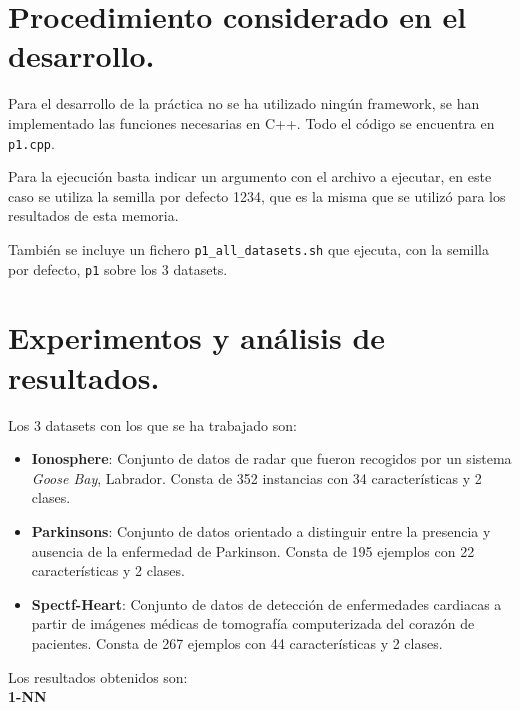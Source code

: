 \documentclass[11pt,a4paper]{article}
\theoremstyle{definition}
\begin{document}
	

	\section{Procedimiento considerado en el desarrollo.}
	Para el desarrollo de la práctica no se ha utilizado ningún framework, se han implementado las funciones necesarias en C++. Todo el código se encuentra en \texttt{p1.cpp}.
	
	Para la ejecución basta indicar un argumento con el archivo a ejecutar, en este caso se utiliza la semilla por defecto 1234, que es la misma que se utilizó para los resultados de esta memoria.
	
	También se incluye un fichero \texttt{p1\_all\_datasets.sh} que ejecuta, con la semilla por defecto, \texttt{p1} sobre los 3 datasets.
	\section{Experimentos y análisis de resultados.}
	Los 3 datasets con los que se ha trabajado son:
	\begin{itemize}
		\item \textbf{Ionosphere}: Conjunto de datos de radar que fueron recogidos por un sistema \textit{Goose Bay}, Labrador. Consta de 352 instancias con 34 características y 2 clases.
		\item \textbf{Parkinsons}: Conjunto de datos orientado a distinguir entre la presencia y ausencia de la enfermedad de Parkinson. Consta de 195 ejemplos con 22 características y 2 clases.
		\item \textbf{Spectf-Heart}: Conjunto de datos de detección de enfermedades cardiacas a partir de imágenes médicas de tomografía computerizada del corazón de pacientes. Consta de 267 ejemplos con 44 características y 2 clases.
	\end{itemize}
	
	Los resultados obtenidos son:~\\
	
	\textbf{1-NN}
\end{document}
